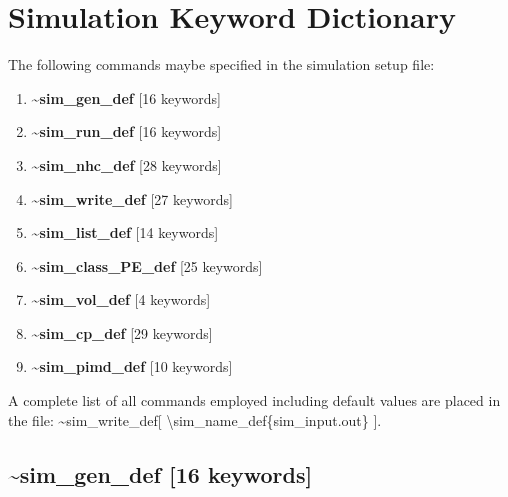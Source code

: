 \documentclass[12pt,titlepage]{article}
\begin{document}
\section{\bf Simulation Keyword Dictionary} 

The following commands maybe specified in the simulation setup file:
\begin{enumerate}
\item {\bf \~{}sim\_gen\_def} [16 keywords]
\item {\bf \~{}sim\_run\_def} [16 keywords]
\item {\bf \~{}sim\_nhc\_def} [28 keywords]
\item {\bf \~{}sim\_write\_def} [27 keywords]
\item {\bf \~{}sim\_list\_def} [14 keywords]
\item {\bf \~{}sim\_class\_PE\_def} [25 keywords]
\item {\bf \~{}sim\_vol\_def} [4 keywords]
\item {\bf \~{}sim\_cp\_def} [29 keywords]
\item {\bf \~{}sim\_pimd\_def} [10 keywords]
\end{enumerate}
A complete list of all commands employed including default
values are placed in the file:
\~{}sim\_write\_def[ \textbackslash{}sim\_name\_def\{sim\_input.out\} ]. 


\newpage
\subsection*{\bf \~{}sim\_gen\_def [16 keywords]}
\end{document}
